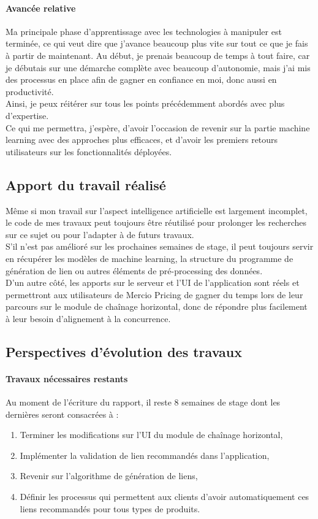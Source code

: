 \documentclass{rapportCS}
\begin{document}
\paragraph{Avancée relative}
Ma principale phase d'apprentissage avec les technologies à manipuler est terminée,
ce qui veut dire que j'avance beaucoup plus vite sur tout ce que je fais à partir de maintenant.
Au début, je prenais beaucoup de temps à tout faire, car je débutais sur une démarche complète avec
beaucoup d'autonomie, mais j'ai mis des processus en place afin de gagner en confiance en moi, donc 
aussi en productivité.\\
Ainsi, je peux réitérer sur tous les points précédemment abordés avec plus d'expertise.\\
Ce qui me permettra, j'espère, d'avoir l'occasion de revenir sur la partie machine learning avec 
des approches plus efficaces, et d'avoir les premiers retours utilisateurs sur les
fonctionnalités déployées.


\subsection{Apport du travail réalisé}
Même si mon travail sur l'aspect intelligence artificielle est largement incomplet, le code de mes travaux peut
toujours être réutilisé pour prolonger les recherches sur ce sujet ou pour l'adapter à de futurs travaux.\\
S'il n'est pas amélioré sur les prochaines semaines de stage, il peut toujours servir en
récupérer les modèles de machine learning, la structure du programme de génération de lien
ou autres éléments de pré-processing des données.\\

D'un autre côté, les apports sur le serveur et l'UI de l'application sont réels et permettront aux utilisateurs
de Mercio Pricing de gagner du temps lors de leur parcours sur le module de chaînage horizontal, donc de 
répondre plus facilement à leur besoin d'alignement à la concurrence. 

\subsection{Perspectives d'évolution des travaux}
\paragraph{Travaux nécessaires restants}
Au moment de l'écriture du rapport, il reste 8 semaines de stage dont les dernières seront consacrées à :
\begin{enumerate}
  \item Terminer les modifications sur l'UI du module de chaînage horizontal,
  \item Implémenter la validation de lien recommandés dans l'application,
  \item Revenir sur l'algorithme de génération de liens,
  \item Définir les processus qui permettent aux clients d'avoir automatiquement ces liens recommandés
  pour tous types de produits.
\end{enumerate}
\end{document}
